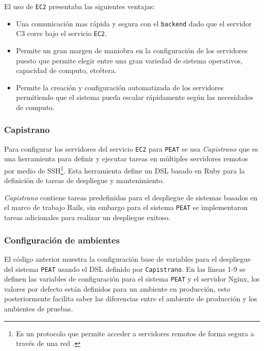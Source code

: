 El uso de \texttt{EC2} presentaba las siguientes ventajas:
\begin{itemize}
\item Una comunicación mas rápida y segura con el \texttt{backend} dado que el
  servidor C3 corre bajo el servicio \texttt{EC2}.
\item Permite un gran margen de maniobra en la configuración de los servidores
  puesto que permite elegir entre una gran variedad de sistema operativos,
  capacidad de computo, etcétera.
\item Permite la creación y configuración automatizada de los servidores
  permitiendo que el sistema pueda escalar rápidamente según las necesidades
  de computo.
\end{itemize}

\subsubsection{Capistrano}

Para configurar los servidores del servicio \texttt{EC2} para \texttt{PEAT} se usa
\textit{Capistrano} que es una herramienta para definir y ejecutar tareas en
múltiples servidores remotos por medio de SSH\footnote{Es un protocolo que permite
  acceder a servidores remotos de forma segura a través de una red
  \cite{29_ssh_protocol}.}. Esta herramienta define un DSL basado en Ruby para la
definición de tareas de despliegue y mantenimiento.

\textit{Capistrano} contiene tareas predefinidas para el despliegue de sistemas
basados en el marco de trabajo Rails, sin embargo para el sistema \texttt{PEAT} se
implementaron tareas adicionales para realizar un despliegue exitoso.

\subsubsection{Configuración de ambientes}



El código anterior muestra la configuración base de variables para el
despliegue del sistema \texttt{PEAT} usando el DSL definido por \texttt{Capistrano}.
En las líneas 1-9 se definen las variables de configuración para el sistema
\texttt{PEAT} y el servidor Nginx, los valores por defecto están definidos
para un ambiente en producción, esto posteriormente facilita saber las diferencias
entre el ambiente de producción y los ambientes de pruebas.

